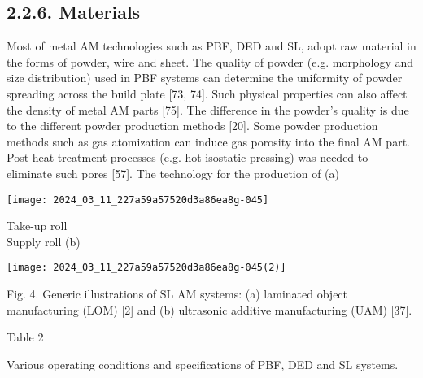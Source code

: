 \documentclass[10pt]{article}
\begin{document}
\subsection*{2.2.6. Materials}
Most of metal AM technologies such as PBF, DED and SL, adopt raw material in the forms of powder, wire and sheet. The quality of powder (e.g. morphology and size distribution) used in PBF systems can determine the uniformity of powder spreading across the build plate [73, 74]. Such physical properties can also affect the density of metal AM parts [75]. The difference in the powder's quality is due to the different powder production methods [20]. Some powder production methods such as gas atomization can induce gas porosity into the final AM part. Post heat treatment processes (e.g. hot isostatic pressing) was needed to eliminate such pores [57]. The technology for the production of (a)

\begin{center}
\texttt{[image: 2024\_03\_11\_227a59a57520d3a86ea8g-045]}
\end{center}

Take-up roll\\
Supply roll (b)

\begin{center}
\texttt{[image: 2024\_03\_11\_227a59a57520d3a86ea8g-045(2)]}
\end{center}

Fig. 4. Generic illustrations of SL AM systems: (a) laminated object manufacturing (LOM) [2] and (b) ultrasonic additive manufacturing (UAM) [37].

Table 2

Various operating conditions and specifications of PBF, DED and SL systems.
\end{document}
